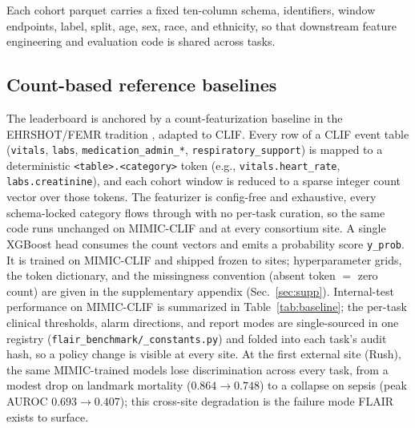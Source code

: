 Each cohort parquet carries a fixed ten-column schema, identifiers,
window endpoints, label, split, age, sex, race, and ethnicity, so
that downstream feature engineering and evaluation code is shared
across tasks.

\subsection*{Count-based reference baselines}

The leaderboard is anchored by a count-featurization baseline in the
EHRSHOT/FEMR tradition \citep{wornow2023ehrshot,steinberg2021femr},
adapted to CLIF. Every row of a CLIF event table (\texttt{vitals},
\texttt{labs}, \texttt{medication\_admin\_*},
\texttt{respiratory\_support}) is mapped to a deterministic
\texttt{<table>.<category>} token (e.g., \texttt{vitals.heart\_rate},
\texttt{labs.creatinine}), and each cohort window is reduced to a
sparse integer count vector over those tokens. The featurizer is
config-free and exhaustive, every schema-locked category flows
through with no per-task curation, so the same code runs unchanged on
MIMIC-CLIF and at every consortium site. A single XGBoost head consumes
the count vectors and emits a probability score \texttt{y\_prob}. It is
trained on MIMIC-CLIF and shipped frozen to sites; hyperparameter grids,
the token dictionary, and the missingness convention (absent token $=$
zero count) are given in the supplementary appendix
(Sec.~\ref{sec:supp}). Internal-test performance on MIMIC-CLIF is
summarized in Table~\ref{tab:baseline}; the per-task clinical
thresholds, alarm directions, and report modes are single-sourced in
one registry (\texttt{flair\_benchmark/\_constants.py}) and folded into
each task's audit hash, so a policy change is visible at every site. At
the first external site (Rush), the same MIMIC-trained models lose
discrimination across every task, from a modest drop on landmark
mortality ($0.864\rightarrow0.748$) to a collapse on sepsis (peak AUROC
$0.693\rightarrow0.407$); this cross-site degradation is the failure
mode FLAIR exists to surface.

